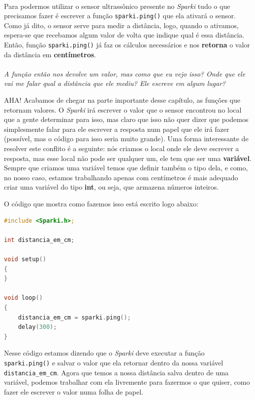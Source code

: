     \paragraph{}
    Para podermos utilizar o sensor ultrassônico presente no \textit{Sparki} tudo o que precisamos fazer é escrever a função \lstinline[columns=fixed]{sparki.ping()} que ela ativará o sensor. Como já dito, o sensor serve para medir a distância, logo, quando o ativamos, espera-se que recebamos algum valor de volta que indique qual é essa distância. Então, função \lstinline[columns=fixed]{sparki.ping()} já faz os cálculos necessários e nos \textbf{retorna} o valor da distância em \textbf{centímetros}.
    \\~\\
    \textit{A função então nos devolve um valor, mas como que eu vejo isso? Onde que ele vai me falar qual a distância que ele mediu? Ele escreve em algum lugar?} \par
    AHA! Acabamos de chegar na parte importante desse capítulo, as funções que retornam valores. O \textit{Sparki} irá escrever o valor que o sensor encontrou no local que a gente determinar para isso, mas claro que isso não quer dizer que podemos simplesmente falar para ele escrever a resposta num papel que ele irá fazer (possível, mas o código para isso seria muito grande). Uma forma interessante de resolver este conflito é a seguinte: nós criamos o local onde ele deve escrever a resposta, mas esse local não pode ser qualquer um, ele tem que ser uma \textbf{variável}. Sempre que criamos uma variável temos que definir também o tipo dela, e como, no nosso caso, estamos trabalhando apenas com centímetros é mais adequado criar uma variável do tipo \textbf{int}, ou seja, que armazena números inteiros.
    
    O código que mostra como fazemos isso está escrito logo abaixo:
    
\begin{lstlisting}[language=C]
#include <Sparki.h>;

int distancia_em_cm;

void setup()
{
}

void loop()
{
    distancia_em_cm = sparki.ping();  
    delay(300);
}
\end{lstlisting}

    Nesse código estamos dizendo que o \textit{Sparki} deve executar a função \lstinline[columns=fixed]{sparki.ping()} e salvar o valor que ela retornar dentro da nossa variável \lstinline[columns=fixed]{distancia_em_cm}. Agora que temos a nossa distância salva dentro de uma variável, podemos trabalhar com ela livremente para fazermos o que quiser, como fazer ele escrever o valor numa folha de papel.
    

